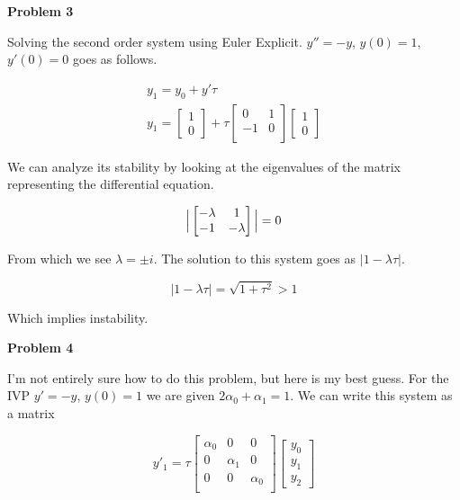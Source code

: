 \documentclass[a4paper,12pt]{article}
\begin{document}
{\bf Problem  3}
\smallskip

Solving the second order system using Euler Explicit. $y''=-y$, $y(0)=1$, $y'(0)=0$ goes as follows. 

\begin{eqnarray*}
y_1=y_0+y'\tau \\
 y_1=\begin{bmatrix}
	1 \\
	0 
	\end{bmatrix}+\tau
	\begin{bmatrix}
	0 & 1  \\[0.2em]
	-1 & 0  \\[0.2em]
     \end{bmatrix}
\begin{bmatrix}
	1 \\
	0 
	\end{bmatrix} 
\end{eqnarray*} 

We can analyze its stability by looking at the eigenvalues of the matrix representing the differential equation. 

\begin{equation*}
\Big{|}
\begin{bmatrix}
-\lambda & 1  \\
-1 & -\lambda  
\end{bmatrix}
\Big{|}=0
\bigskip
\end{equation*}

From which we see $\lambda= \pm i$. The solution to this system goes as $|1- \lambda \tau |$. 

\begin{equation*}
|1-\lambda \tau|=\sqrt{1+\tau^2}>1
\end{equation*}

Which implies instability. 
\bigskip

{\bf Problem  4}
\smallskip

I'm not entirely sure how to do this problem, but here is my best guess. For the IVP $y'=-y$, $y(0)=1$ we are given $2 \alpha_0+\alpha_1=1$. We can write this system as a matrix

\begin{equation*}
y'_1=\tau  
\begin{bmatrix}
	\alpha_0 & 0 & 0  \\[0.2em]
	0 & \alpha_1 & 0  \\[0.2em]
	0 & 0 &\alpha_ 0  \\[0.2em]
\end{bmatrix}
\begin{bmatrix}
y_0 \\
y_1 \\
y_2 
\end{bmatrix}
\end{equation*}
\end{document}
